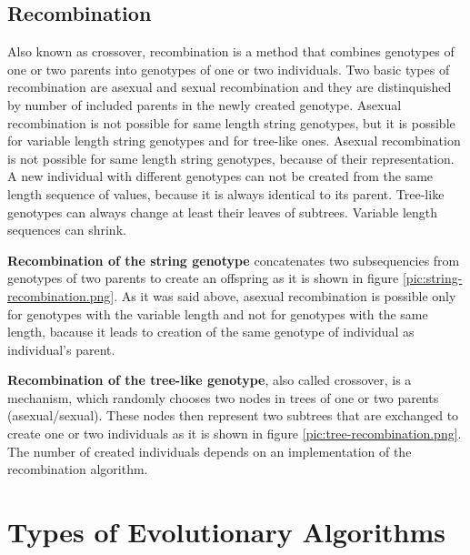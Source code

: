 \clearpage

\subsection{Recombination}
Also known as crossover, recombination is a method that combines genotypes of one or two parents into genotypes of one or two individuals. Two basic types of recombination are asexual and sexual recombination and they are distinquished by number of included parents in the newly created genotype. Asexual recombination is not possible for same length string genotypes, but it is possible for variable length string genotypes and for tree-like ones. Asexual recombination is not possible for same length string genotypes, because of their representation. A new individual with different genotypes can not be created from the same length sequence of values, because it is always identical to its parent. Tree-like genotypes can always change at least their leaves of subtrees. Variable length sequences can shrink.

\textbf{Recombination of the string genotype} concatenates two subsequencies from genotypes of two parents to create an offspring as it is shown in figure \ref{pic:string-recombination.png}. As it was said above, asexual recombination is possible only for genotypes with the variable length and not for genotypes with the same length, bacause it leads to creation of the same genotype of individual as individual's parent.

\textbf{Recombination of the tree-like genotype}, also called crossover, is a mechanism, which randomly chooses two nodes in trees of one or two parents (asexual/sexual). These nodes then represent two subtrees that are exchanged to create one or two individuals as it is shown in figure \ref{pic:tree-recombination.png}. The number of created individuals depends on an implementation of the recombination algorithm.

\clearpage

\section{Types of Evolutionary Algorithms}

